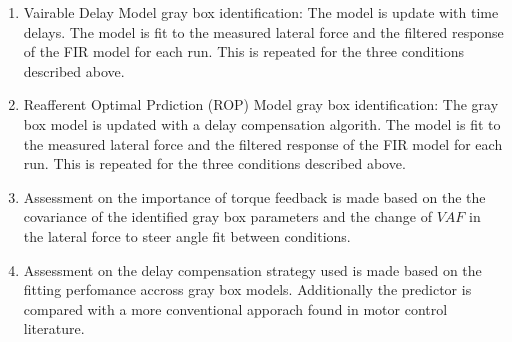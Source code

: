 \begin{enumerate}
    \item Vairable Delay Model gray box identification: The model is update with time delays. The model  is fit to the measured lateral force and the filtered response of the FIR model for each run. This is repeated for the three conditions described above. 
    \item Reafferent Optimal Prdiction (ROP) Model gray box identification: The gray box model is updated with a delay compensation algorith. The model is fit to the measured lateral force and the filtered response of the FIR model for each run. This is repeated for the three conditions described above.
    \item Assessment on the importance of torque feedback is made based on the the covariance of the identified gray box parameters and the change of \ensuremath{\mathit{VAF}}  in the lateral force to steer angle fit between conditions.
    \item Assessment on the delay compensation strategy used is made based on the fitting perfomance accross gray box models. Additionally the predictor is compared with a more conventional apporach found in motor control literature. 

\end{enumerate}
